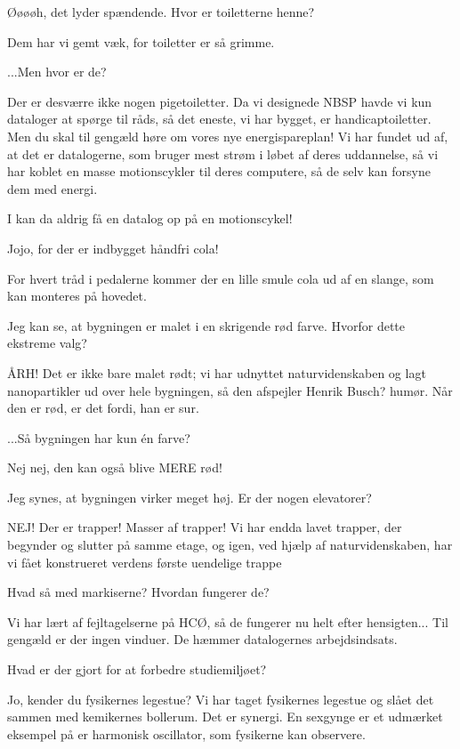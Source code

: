 \documentclass[a4paper,11pt]{article}
\begin{document}
\begin{sketch}
 Øøøøh, det lyder spændende. Hvor er toiletterne henne?

 Dem har vi gemt væk, for toiletter er så grimme.

 ...Men hvor er de?

 Der er desværre ikke nogen pigetoiletter. Da vi designede NBSP havde vi kun dataloger at spørge til råds, så det eneste, vi har bygget, er handicaptoiletter. Men du skal til gengæld høre om vores nye energispareplan! Vi har fundet ud af, at det er datalogerne, som bruger mest strøm i løbet af deres uddannelse, så vi har koblet en masse motionscykler til deres computere, så de selv kan forsyne dem med energi.

 I kan da aldrig få en datalog op på en motionscykel!

 Jojo, for der er indbygget håndfri cola!


 For hvert tråd i pedalerne kommer der en lille smule cola ud af en slange, som kan monteres på hovedet.

 Jeg kan se, at bygningen er malet i en skrigende rød farve. Hvorfor dette ekstreme valg?

 ÅRH! Det er ikke bare malet rødt; vi har udnyttet naturvidenskaben og lagt nanopartikler ud over hele bygningen, så den afspejler Henrik Busch? humør. Når den er rød, er det fordi, han er sur.

 ...Så bygningen har kun én farve?

 Nej nej, den kan også blive MERE rød!

 Jeg synes, at bygningen virker meget høj. Er der nogen elevatorer?

 NEJ! Der er trapper! Masser af trapper! Vi har endda lavet trapper, der begynder og slutter på samme etage, og igen, ved hjælp af naturvidenskaben, har vi fået konstrueret verdens første uendelige trappe


 Hvad så med markiserne? Hvordan fungerer de?

 Vi har lært af fejltagelserne på HCØ, så de fungerer nu helt efter hensigten... Til gengæld er der ingen vinduer. De hæmmer datalogernes arbejdsindsats.

 Hvad er der gjort for at forbedre studiemiljøet?

 Jo, kender du fysikernes legestue? Vi har taget fysikernes legestue og slået det sammen med kemikernes bollerum. Det er synergi. En sexgynge er et udmærket eksempel på er harmonisk oscillator, som fysikerne kan observere.


\end{sketch}
\end{document}
